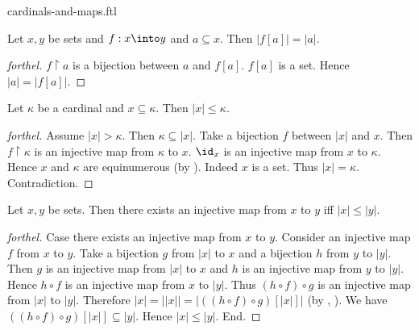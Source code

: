 \documentclass{naproche-library}
\begin{document}
\begin{smodule}[title=Cardinal Numbers and Maps]{cardinals-and-maps.ftl}

\begin{proposition}[forthel,id=SET_THEORY_06_5513850721927168]
  Let $x, y$ be sets and $f : x \into y$ and $a \subseteq x$.
  Then $|f[a]| = |a|$.
\end{proposition}
\begin{proof}[forthel]
  $f \restriction a$ is a bijection between $a$ and $f[a]$.
  $f[a]$ is a set.
  Hence $|a| = |f[a]|$.
\end{proof}

\begin{proposition}[forthel,id=SET_THEORY_06_6702394681735923]
  Let $\kappa$ be a cardinal and $x \subseteq \kappa$.
  Then $|x| \leq \kappa$.
\end{proposition}
\begin{proof}[forthel]
  Assume $|x| > \kappa$.
  Then $\kappa \subseteq |x|$.
  Take a bijection $f$ between $|x|$ and $x$.
  Then $f \restriction \kappa$ is an injective map from $\kappa$ to $x$.
  $\id_{x}$ is an injective map from $x$ to $\kappa$.
  Hence $x$ and $\kappa$ are equinumerous (by ).
  Indeed $x$ is a set.
  Thus $|x| = \kappa$.
  Contradiction.
\end{proof}

\begin{proposition}[forthel,id=SET_THEORY_06_407116133171200]
  Let $x, y$ be sets.
  Then there exists an injective map from $x$ to $y$ iff $|x| \leq |y|$.
\end{proposition}
\begin{proof}[forthel]
  Case there exists an injective map from $x$ to $y$.
    Consider an injective map $f$ from $x$ to $y$.
    Take a bijection $g$ from $|x|$ to $x$ and a bijection $h$ from $y$ to $|y|$.
    Then $g$ is an injective map from $|x|$ to $x$ and $h$ is an injective map from $y$ to $|y|$.
    Hence $h \circ f$ is an injective map from $x$ to $|y|$.
    Thus $(h \circ f) \circ g$ is an injective map from $|x|$ to $|y|$.
    Therefore $|x|
      = ||x||
      = |((h \circ f) \circ g)[|x|]|$
    (by , ).
    We have $((h \circ f) \circ g)[|x|] \subseteq |y|$.
    Hence $|x| \leq |y|$.
  End.


\end{proof}
\end{smodule}
\end{document}
